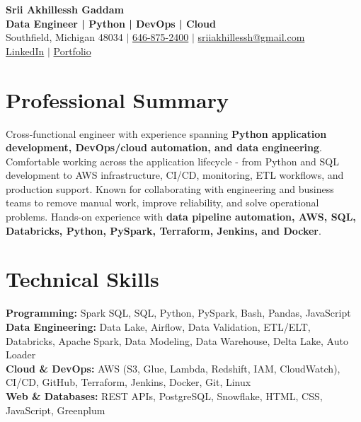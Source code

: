 \documentclass[letterpaper,10pt]{article}
\begin{document}
\fontsize{9.35pt}{10.45pt}\selectfont

\begin{center}
    {\LARGE \textbf{Srii Akhillessh Gaddam}} \\[-1pt]
    \textbf{Data Engineer | Python | DevOps | Cloud} \\[2pt]
    Southfield, Michigan 48034 $|$
    \href{tel:6468752400}{646-875-2400} $|$
    \href{mailto:sriiakhillessh@gmail.com}{sriiakhillessh@gmail.com} \\[1pt]
    \href{https://www.linkedin.com/in/srii-akhiilessh-gaddam-b48668191/}{LinkedIn} $|$
    \href{https://sriiakhillesshg.github.io/portfolio/}{Portfolio}
\end{center}
\vspace{-8pt}

\section{Professional Summary}
\small{Cross-functional engineer with experience spanning \textbf{Python application development, DevOps/cloud automation, and data engineering}. Comfortable working across the application lifecycle - from Python and SQL development to AWS infrastructure, CI/CD, monitoring, ETL workflows, and production support. Known for collaborating with engineering and business teams to remove manual work, improve reliability, and solve operational problems. Hands-on experience with \textbf{data pipeline automation, AWS, SQL, Databricks, Python, PySpark, Terraform, Jenkins, and Docker}.}

\section{Technical Skills}
\small{
\textbf{Programming:} Spark SQL, SQL, Python, PySpark, Bash, Pandas, JavaScript \\
\textbf{Data Engineering:} Data Lake, Airflow, Data Validation, ETL/ELT, Databricks, Apache Spark, Data Modeling, Data Warehouse, Delta Lake, Auto Loader \\
\textbf{Cloud \& DevOps:} AWS (S3, Glue, Lambda, Redshift, IAM, CloudWatch), CI/CD, GitHub, Terraform, Jenkins, Docker, Git, Linux \\
\textbf{Web \& Databases:} REST APIs, PostgreSQL, Snowflake, HTML, CSS, JavaScript, Greenplum
}
\end{document}
